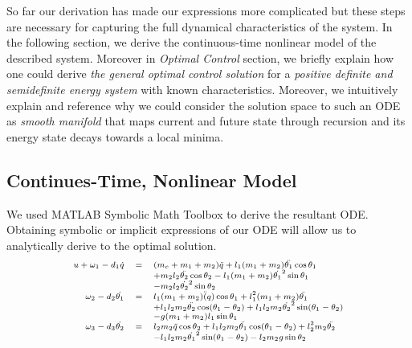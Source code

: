 \documentclass[journal]{IEEEtran}
\begin{document}
So far our derivation has made our expressions more complicated but these steps are
necessary for capturing the full dynamical characteristics of the system. In the
following section, we derive the continuous-time nonlinear model of the described
system. Moreover in \emph{Optimal Control} section, we briefly explain how one
could derive \emph{the general optimal control solution} for a \emph{positive
definite and semidefinite energy system} with known characteristics.
Moreover, we intuitively explain and reference why we could consider the solution
space to such an ODE as \emph{smooth manifold} that maps current and future state
through recursion and its energy state decays towards a local minima.


\subsection{Continues-Time, Nonlinear Model}
We used MATLAB Symbolic Math Toolbox to derive the resultant ODE. Obtaining
symbolic or implicit expressions of our ODE will allow us to analytically derive
to the optimal solution.
\begin{equation}
\text{\scriptsize $
\begin{array}{rcl}
    u + \omega_1 -d_1 \dot{q} &=& (m_c+m_1+m_2)\ddot{q}+l_1(m_1+m_2)\ddot{\theta_1} \cos \theta_1\\
    & & + m_2 l_2 \ddot{\theta_2} \cos \theta_2 - l_1 (m_1+m_2) \dot{\theta_1}^2 \sin \theta_1 \\
    & & - m_2 l_2 \dot{\theta_2}^2 \sin \theta_2\\
    \omega_2 -d_2 \dot{\theta_1} &=& l_1 (m_1+m_2) \ddot(q) \cos \theta_1
    +l_1^2 (m_1+m_2) \ddot{\theta_1}\\
    & & +l_1 l_2 m_2 \ddot{\theta_2} \cos (\theta_1 - \theta_2)+ l_1 l_2 m_2 \dot{\theta_2}^2 \sin(\theta_1 - \theta_2) \\
    & & - g(m_1+m_2) l_1 \sin \theta_1 \\
    \omega_3 -d_3 \dot{\theta_2} &=& l_2 m_2 \ddot{q} \cos \theta_2
    + l_1 l_2 m_2 \ddot{\theta_1} \cos (\theta_1 -\theta_2)
    + l_2^2 m_2 \ddot{\theta_2}\\
    & & -l_1 l_2 m_2 \dot{\theta_1}^2 \sin (\theta_1 - \theta_2)
    - l_2 m_2 g \sin \theta_2\\
    \end{array}
$}
\end{equation}
\end{document}
